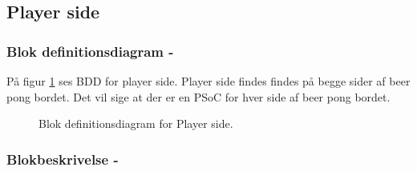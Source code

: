 \documentclass[Arkitektur/System_main.tex]{subfiles}
\begin{document}
\subsection{Player side} \label{sec:playerside_hardware}
\subsubsection{Blok definitionsdiagram - } \label{sec:playerside_hardware_bdd}

På figur \ref{fig:playerside_hardware_bdd} ses BDD for player side. Player side findes findes på begge sider af beer pong bordet. Det vil sige at der er en PSoC for hver side af beer pong bordet. 

\begin{figure}[H]
    \centering
    \caption{Blok definitionsdiagram for Player side.}
    \label{fig:playerside_hardware_bdd}
\end{figure}

\subsubsection{Blokbeskrivelse - } \label{sec:playerside_hardware_block_description}
\end{document}
